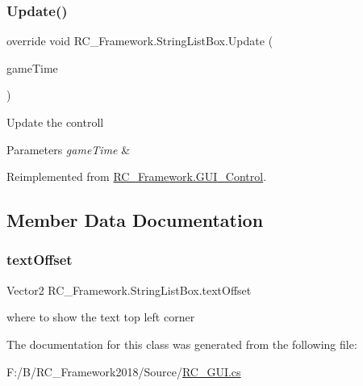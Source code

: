 \mbox{\label{class_r_c___framework_1_1_string_list_box_a8466c2c89cf05f46f4abb281d1517ff5}} 
\subsubsection{\texorpdfstring{Update()}{Update()}}
{\footnotesize\ttfamily override void R\+C\+\_\+\+Framework.\+String\+List\+Box.\+Update (\begin{DoxyParamCaption}\item[{Game\+Time}]{game\+Time }\end{DoxyParamCaption})\hspace{0.3cm}{\ttfamily [virtual]}}



Update the controll 


\begin{DoxyParams}{Parameters}
{\em game\+Time} & \\
\hline
\end{DoxyParams}


Reimplemented from \mbox{\hyperlink{class_r_c___framework_1_1_g_u_i___control_a7aa3b0b6ba141d995ca830ff99ae3003}{R\+C\+\_\+\+Framework.\+G\+U\+I\+\_\+\+Control}}.



\subsection{Member Data Documentation}
\mbox{\label{class_r_c___framework_1_1_string_list_box_ad40023b2817f55bdf400705a24fd1f9e}} 
\subsubsection{\texorpdfstring{text\+Offset}{textOffset}}
{\footnotesize\ttfamily Vector2 R\+C\+\_\+\+Framework.\+String\+List\+Box.\+text\+Offset}



where to show the text top left corner 



The documentation for this class was generated from the following file\+:\begin{DoxyCompactItemize}
\item 
F\+:/\+B/\+R\+C\+\_\+\+Framework2018/\+Source/\mbox{\hyperlink{_r_c___g_u_i_8cs}{R\+C\+\_\+\+G\+U\+I.\+cs}}\end{DoxyCompactItemize}
